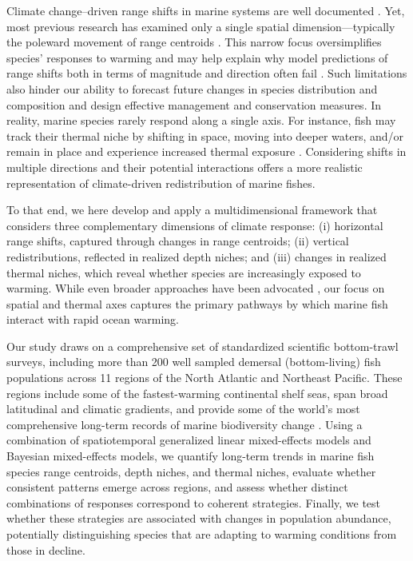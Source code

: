 \documentclass[11pt]{article}
\begin{document}
\begin{spacing}{1.5}
Climate change–driven range shifts in marine systems are well documented \citep{poloczanska_global_2013, burrows_geographical_2014}. Yet, most previous research has examined only a single spatial dimension—typically the poleward movement of range centroids \citep[e.g.][]{nye_changing_2009,  dulvy_climate_2008, pinsky_marine_2013}. This narrow focus oversimplifies species' responses to warming and may help explain why model predictions of range shifts both in terms of magnitude and direction often fail \citep{lawlor_mechanisms_2024, fredston_reimagining_2025}. Such limitations also hinder our ability to forecast future changes in species distribution and composition and design effective management and conservation measures. In reality, marine species rarely respond along a single axis. For instance, fish may track their thermal niche by shifting in space, moving into deeper waters, and/or remain in place and experience increased thermal exposure \citep{nye_changing_2009}. Considering shifts in multiple directions and their potential interactions offers a more realistic representation of climate-driven redistribution of marine fishes.

To that end, we here develop and apply a multidimensional framework that considers three complementary dimensions of climate response: (i) horizontal range shifts, captured through changes in range centroids; (ii) vertical redistributions, reflected in realized depth niches; and (iii) changes in realized thermal niches, which reveal whether species are increasingly exposed to warming. While even broader approaches have been advocated \citep{fredston_reimagining_2025}, our focus on spatial and thermal axes captures the primary pathways by which marine fish interact with rapid ocean warming.

Our study draws on a comprehensive set of standardized scientific bottom-trawl surveys, including more than 200 well sampled demersal (bottom-living) fish populations across 11 regions of the North Atlantic and Northeast Pacific. These regions include some of the fastest-warming continental shelf seas, span broad latitudinal and climatic gradients, and provide some of the world's most comprehensive long-term records of marine biodiversity change \citep{maureaud_are_2021, maureaud_fishglob_data_2024}. Using a combination of spatiotemporal generalized linear mixed-effects models and Bayesian mixed-effects models, we quantify long-term trends in marine fish species range centroids, depth niches, and thermal niches, evaluate whether consistent patterns emerge across regions, and assess whether distinct combinations of responses correspond to coherent strategies. Finally, we test whether these strategies are associated with changes in population abundance, potentially distinguishing species that are adapting to warming conditions from those in decline.


\end{spacing}
\end{document}
